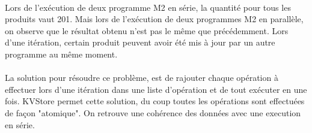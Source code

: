 \paragraph{}
Lors de l'exécution de deux programme M2 en série, la quantité pour tous les produits vaut 201. Mais lors de l'exécution de deux programmes M2 en parallèle, on observe que le résultat obtenu n'est pas le même que précédemment. Lors d'une itération, certain produit peuvent avoir été mis à jour par un autre programme au même moment.

\paragraph{}
La solution pour résoudre ce problème, est de rajouter chaque opération à effectuer lors d'une itération dans une liste d'opération et de tout exécuter en une fois. KVStore permet cette solution, du coup toutes les opérations sont effectuées de façon "atomique". On retrouve une cohérence des données avec une execution en série.
